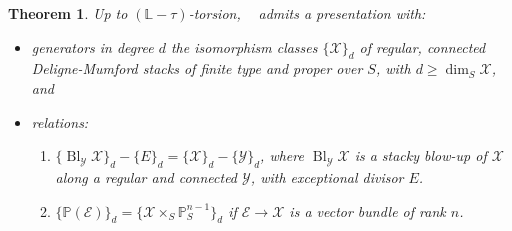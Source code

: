 \documentclass{amsart}
\newtheorem{thm}{Theorem}[section]
\theoremstyle{definition}
\DeclareMathOperator{\Bl}{Bl}
\DeclareMathOperator{\DM}{DM}
\DeclareMathOperator{\KdmS}{K_0(\DM_S^{\dim})}
\numberwithin{equation}{section}
\begin{document}
\begin{thm}\label{K0DMbit}
Up to $(\mathbb{L}-\tau)$-torsion, $\KdmS$ admits a presentation with:
\begin{itemize}
    \item generators in degree $d$ the isomorphism classes $\{\mathscr{X}\}_d$ of regular, connected Deligne-Mumford stacks of finite type and proper over $S$, with $d \geq \dim_S \mathscr{X}$, and
    \item relations:
        \begin{enumerate}[label=(\arabic{enumi}')]
            \item $\{ \Bl_\mathscr{Y} \mathscr{X} \}_d - \{ E\}_d = \{\mathscr{X}\}_d - \{\mathscr{Y}\}_d$, where $\Bl_\mathscr{Y} \mathscr{X}$ is a stacky blow-up of $\mathscr{X}$ along a regular and connected $\mathscr{Y}$, with exceptional divisor $E$.
            \item $\{ \mathbb{P}(\mathscr{E}) \}_d = \{\mathscr{X} \times_S \mathbb{P}^{n-1}_S \}_d$ if $\mathscr{E} \rightarrow \mathscr{X}$ is a vector bundle of rank $n$.
        \end{enumerate}
\end{itemize}
\end{thm}
\end{document}
